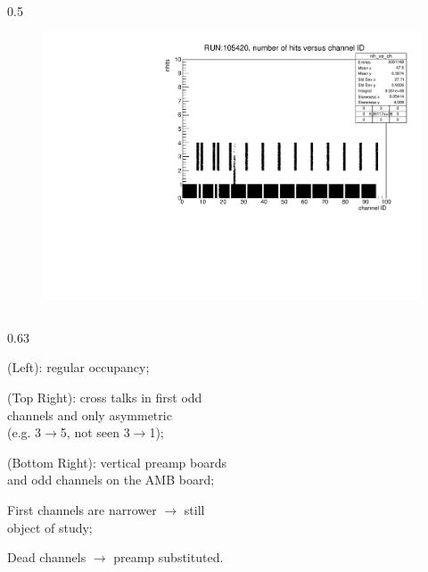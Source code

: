 \documentclass{beamer}
\begin{document}
\begin{frame}
\begin{columns}
\begin{column}{0.5\framewidth}
\begin{figure}[!h]
\includegraphics[width=0.95\columnwidth]{figures/pdf/run105420_nh_vs_ch.pdf}
     \label{fig:normalhits}
\end{figure}
\end{column}
\end{columns}
\vspace{-1.5mm}
    \begin{columns}
    \begin{column}{0.63\framewidth}
        \setlength{\leftmargini}{1.1em}
      \begin{itemize}
 {\footnotesize
 \item (Left): regular occupancy;
 \vspace{-0.3mm}
 \item (Top Right): cross talks in first odd \\ channels and only asymmetric \\ (e.g. 3$\rightarrow$5, not seen 3$\rightarrow$1); 
 \vspace{-0.3mm}
 \item (Bottom Right): vertical preamp boards \\ and odd channels on the AMB board;
 \vspace{-0.3mm}
 \item First channels are narrower $\rightarrow$ still \\ object of study;
 \vspace{-1mm}
 \item Dead channels $\rightarrow$ preamp substituted.}


\end{itemize}
\end{column}
\end{columns}
\end{frame}
\end{document}
